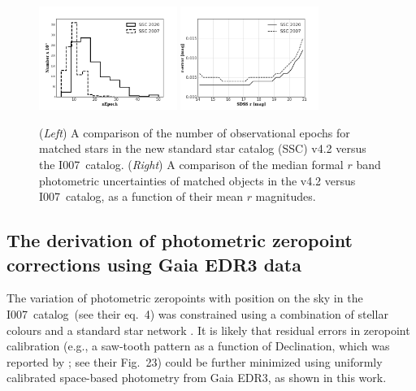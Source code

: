 \documentclass[fleqn,usenatbib]{mnras}
\newcommand{\pOc}{\hbox{I007 catalog}}
\begin{document}
\begin{figure}
\centering
\includegraphics[width=0.4\textwidth, keepaspectratio]{figures/nepoch_compOvsN_BW.png}
\includegraphics[width=0.4\textwidth, keepaspectratio]{figures/rerr_compOvsN_BW.png}
\caption{({\it Left}) A comparison of the number of observational epochs for matched stars in the new standard star catalog (SSC) v4.2 versus the \pOc. ({\it Right}) A comparison of the median formal $r$ band photometric uncertainties of matched objects in the v4.2 versus \pOc, as a function of their mean $r$ magnitudes.
\label{fig:rerr_nvso}}
\end{figure}


\subsection{The derivation of  photometric zeropoint corrections using Gaia EDR3 data\label{sec:GaiaCorr}} 

The variation of photometric zeropoints with position on the sky in the \pOc\ (see their eq.~4) was 
constrained using a combination of stellar colours \citep[the principal axes in colour-colour diagrams, for details 
see][]{2004AN....325..583I} and a standard star network \citep{2002AJ....123.2121S,2006AN....327..821T}. It is likely that 
residual errors in zeropoint calibration (e.g., a saw-tooth pattern as a function of Declination,
which was reported by \citealt{2013A&A...552A.124B}; see their Fig.~23) could be further minimized using 
uniformly calibrated space-based photometry from Gaia EDR3, as shown in this work. 
\end{document}
